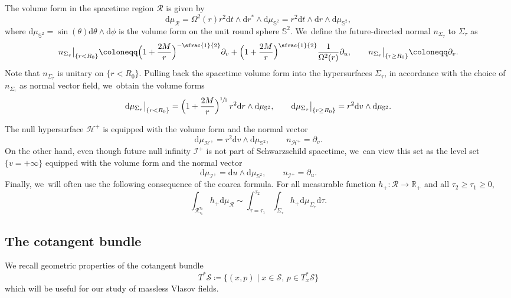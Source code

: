 \documentclass[10pt]{amsart}
\theoremstyle{plain}
\theoremstyle{definition}
\newcommand\R{{\mathbb{R}}}
\renewcommand\H{{\mathcal{H}^+}}
\newcommand\dr{{\mathrm{d}}}
\begin{document}
The volume form in the spacetime region $\mathcal{R}$ is given by
\[
\dr \mu_{\mathcal{R}}=\Omega^2(r)r^2 \dr t\wedge \dr r^* \wedge \dr\mu_{\mathbb{S}^2}=r^2 \dr t\wedge \dr r \wedge \dr\mu_{\mathbb{S}^2},
\]
where $\dr \mu_{\mathbb{S}^2} = \sin(\theta) \dr \theta \wedge \dr \phi$ is the volume form on the unit round sphere $\mathbb{S}^2$. We~define the future-directed normal $n_{\Sigma_\tau}$ to $\Sigma_\tau$ as
\begin{equation*}
n_{\Sigma_\tau}\big|_{\{r<R_0\}}\coloneqq \Bigl(1+\frac{2M}{r} \Bigr)^{-\sfrac{1}{2}}\partial_v+\Bigl(1+\frac{2M}{r}\Bigr)^{\sfrac{1}{2}}\frac{1}{\Omega^2(r)}\partial_u,\qquad n_{\Sigma_\tau}\big|_{\{r\geq R_0\}}\coloneqq\partial_v.
\end{equation*}
Note that $n_{\Sigma_\tau}$ is unitary on $\{ r < R_0 \}$. Pulling back the spacetime volume form into the hypersurfaces $\Sigma_\tau$, in accordance with the choice of $n_{\Sigma_\tau}$ as normal vector field, we~obtain the volume forms
\begin{equation*}
\dr \mu_{\Sigma_\tau}\big|_{\{r<R_0\}}=\Bigl(1+\frac{2M}{r}\Bigr)^{\sfrac{1}{2}} \,r^2 \dr r \wedge \dr\mu_{\mathbb{S}^2},\qquad \dr \mu_{\Sigma_\tau}\big|_{\{r\geq R_0\}}=r^2 \dr v \wedge \dr\mu_{\mathbb{S}^2}.
\end{equation*}

The null hypersurface $\H$ is equipped with the volume form and the normal vector
\[
\dr \mu_{\mathcal{H}^+}=r^2 \dr v \wedge \dr\mu_{\mathbb{S}^2},\qquad n_{\H}=\partial_v.
\]
On the other hand, even though future null infinity $\mathcal{I}^+$ is not part of Schwarzschild spacetime, we~can view this set as the level set $\{v=+\infty\}$ equipped with the volume form and the normal vector
\[
\dr \mu_{\mathcal{I}^+}= \dr u \wedge \dr\mu_{\mathbb{S}^2},\qquad n_{\mathcal{I}^+}=\partial_u.
\]
Finally, we~will often use the following consequence of the coarea formula. For all measurable function $h_+ \colon \mathcal{R} \to \R_+$ and all $\tau_2 \geq \tau_1 \geq 0$,
\begin{equation}\label{eq:coarea}
\int_{\mathcal{R}_{\tau_1}^{\tau_2}} h_+ \dr \mu_{\mathcal{R}} \sim \int_{\tau = \tau_1}^{\tau_2} \int_{\Sigma_\tau} h_+ \dr \mu_{\Sigma_\tau} \dr \tau \tag{coarea}.
\end{equation}

\subsection{The cotangent bundle}\label{Subseccotan} We recall geometric properties of the cotangent bundle
\[
T^* \mathcal{S} \coloneqq \{ (x,p) \mid x \in \mathcal{S}, \, p \in T^*_x\mathcal{S} \}
\]
which will be useful for our study of massless Vlasov fields.
\end{document}
